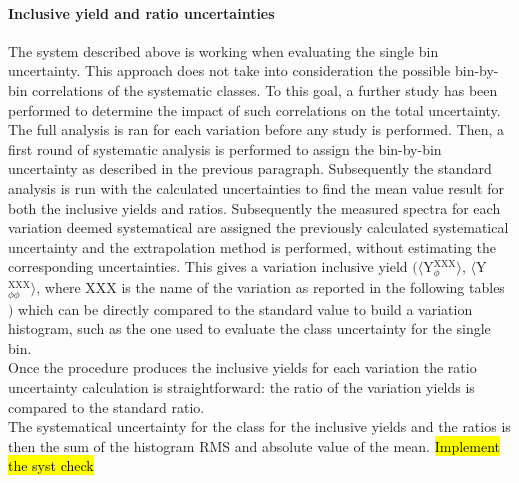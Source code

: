 \paragraph{Inclusive yield and ratio uncertainties}
The system described above is working when evaluating the single bin uncertainty. This approach does not take into consideration the possible bin-by-bin correlations of the systematic classes. To this goal, a further study has been performed to determine the impact of such correlations on the total uncertainty.\\
\indent The full analysis is ran for each variation before any study is performed. Then, a first round of systematic analysis is performed to assign the bin-by-bin uncertainty as described in the previous paragraph. Subsequently the standard analysis is run with the calculated uncertainties to find the mean value result for both the inclusive yields and ratios. Subsequently the measured spectra for each variation deemed systematical are assigned the previously calculated systematical uncertainty and the extrapolation method is performed, without estimating the corresponding uncertainties. This gives a variation inclusive yield $\big( \langle $Y$_{\phi}^{\text{XXX}} \rangle$, $\langle $Y$_{\phi\phi}^{\text{XXX}} \rangle$, where XXX is the name of the variation as reported in the following tables $\big)$ which can be directly compared to the standard value to build a variation histogram, such as the one used to evaluate the class uncertainty for the single bin.\\
\indent Once the procedure produces the inclusive yields for each variation the ratio uncertainty calculation is straightforward: the ratio of the variation yields is compared to the standard ratio.\\
\indent The systematical uncertainty for the class for the inclusive yields and the ratios is then the sum of the histogram RMS and absolute value of the mean.
\hl{Implement the syst check}

\newpage

